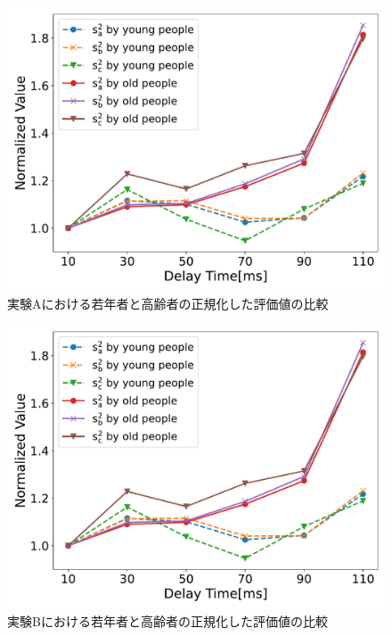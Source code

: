 \begin{figure}[tbp]
  \centering
  \includegraphics[scale=0.5]{figures/Honbann/Comparison_young_old/110_var_normalized.pdf}
  \caption{実験Aにおける若年者と高齢者の正規化した評価値の比較}
  \label{fig:Normalized-Var_110ms_SaSbSc}
\end{figure}

\begin{figure}[tbp]
  \centering
  \includegraphics[scale=0.5]{figures/Honbann/Comparison_young_old/40_var_normalized.pdf}
  \caption{実験Bにおける若年者と高齢者の正規化した評価値の比較}
  \label{fig:Normalized-Var_40ms_SaSbSc}
\end{figure}


